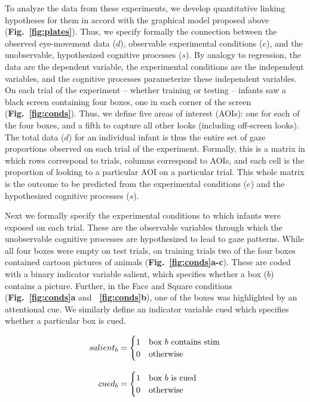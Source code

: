 \documentclass[12pt]{article}
\begin{document}
To analyze the data from these experiments, we develop quantitative linking hypotheses for them in accord with the graphical model proposed above (\textbf{Fig.~\ref{fig:plates}}). Thus, we specify formally the connection between the observed eye-movement data ($d$), observable experimental conditions ($e$), and the unobservable, hypothesized cognitive processes ($s$). By analogy to regression, the data are the dependent variable, the experimental conditions are the independent variables, and the cognitive processes parameterize these independent variables. On each trial of the experiment -- whether training or testing -- infants saw a black screen containing four boxes, one in each corner of the screen (\textbf{Fig.~\ref{fig:conds}}). Thus, we define five areas of interest (AOIs): one for each of the four boxes, and a fifth to capture all other looks (including off-screen looks). The total data ($d$) for an individual infant is thus the entire set of gaze proportions observed on each trial of the experiment. Formally, this is a matrix in which rows correspond to trials, columns correspond to AOIs, and each cell is the proportion of looking to a particular AOI on a particular trial. This whole matrix is the outcome to be predicted from the experimental conditions ($e$) and the hypothesized cognitive processes ($s$).

	Next we formally specify the experimental conditions to which infants were exposed on each trial. These are the observable variables through which the unobservable cognitive processes are hypothesized to lead to gaze patterns. While all four boxes were empty on test trials, on training trials two of the four boxes contained cartoon pictures of animals (\textbf{Fig.~\ref{fig:conds}a-c}). These are coded with a binary indicator variable salient, which specifies whether a box ($b$) contains a picture. Further, in the Face and Square conditions (\textbf{Fig.~\ref{fig:conds}a} and \textbf{~\ref{fig:conds}b}), one of the boxes was highlighted by an attentional cue. We similarly define an indicator variable cued which specifies whether a particular box is cued.

\begin{equation}\label{eq:inds}
\setlength{\jot}{12pt}
\begin{aligned} 
salient_{b} &= \begin{cases} 1 & \text{box $b$ contains stim}\\
	0 &\text{otherwise}
	\end{cases}\\
cued_{b} &=\begin{cases} 1 & \text{box $b$ is cued}\\
	0 &\text{otherwise}
	\end{cases}\\
\end{aligned}
\end{equation}
\end{document}
